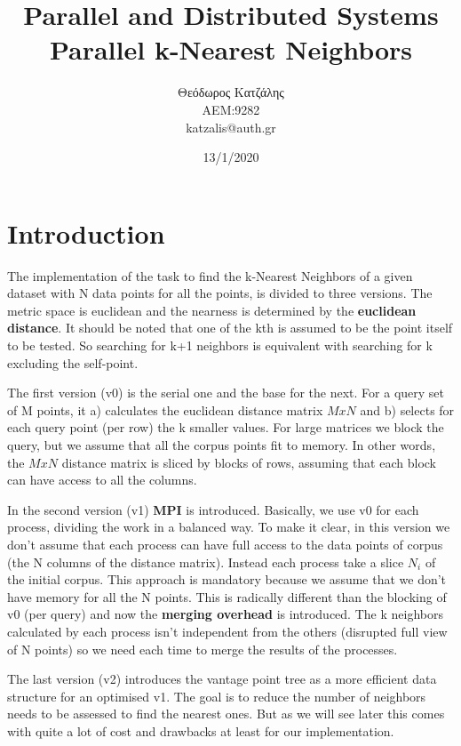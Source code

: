 \documentclass[12pt, a4paper]{article}
\title{\textbf{Parallel and Distributed Systems \\ Parallel k-Nearest Neighbors}}
\author{Θεόδωρος Κατζάλης \\ ΑΕΜ:9282 \\ katzalis@auth.gr}
\date{13/1/2020}
\begin{document}
\sloppy
%
\maketitle



\section{Introduction}

The implementation of the task to find the k-Nearest Neighbors of a given dataset with N data points for all the points, is divided to three versions. The metric space is euclidean and the nearness is determined by the \textbf{euclidean distance}. It should be noted that one of the kth is assumed to be the point itself to be tested. So searching for k+1 neighbors is equivalent with searching for k excluding the self-point.

The first version (v0) is the serial one and the base for the next. For a query set of M points, it a) calculates the euclidean distance matrix $MxN$ and b) selects for each query point (per row) the k smaller values. For large matrices we block the query, but we assume that all the corpus points fit to memory. In other words, the $MxN$ distance matrix is sliced by blocks of rows, assuming that each block can have access to all the columns. 

In the second version (v1) \textbf{MPI} is introduced. Basically, we use v0 for each process, dividing the work in a balanced way. To make it clear, in this version we don't assume that each process can have full access to the data points of corpus (the N columns of the distance matrix). Instead each process take a slice $N_i$ of the initial corpus. This approach is mandatory because we assume that we don't have memory for all the N points. This is radically different than the blocking of v0 (per query) and now the \textbf{merging overhead} is introduced. The k neighbors calculated by each process isn't independent from the others (disrupted full view of N points) so we need each time to merge the results of the processes.

The last version (v2) introduces the vantage point tree as a more efficient data structure for an optimised v1. The goal is to reduce the number of neighbors needs to be assessed to find the nearest ones. But as we will see later this comes with quite a lot of cost and drawbacks at least for our implementation.
\end{document}
